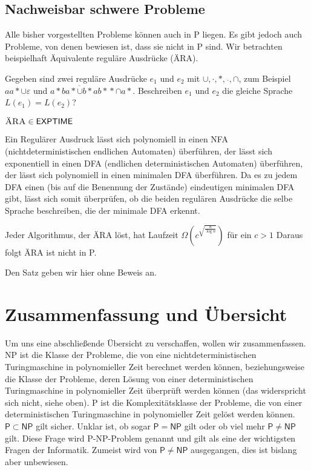 \subsection{Nachweisbar schwere Probleme}
Alle bisher vorgestellten Probleme können auch in \textsf{P} liegen. Es gibt jedoch auch Probleme, von denen bewiesen ist, dass sie nicht in \textsf{P} sind. Wir betrachten beispielhaft Äquivalente reguläre Ausdrücke (\textsc{ÄRA}).

Gegeben sind zwei reguläre Ausdrücke $e_1$ und $e_2$ mit $\cup, \cdot, *, \overline{~}, \cap$, zum Beispiel $aa* \cup \varepsilon$ und $\overline{a* b a* \cup b* a b*}* \cap a*$. Beschreiben $e_1$ und $e_2$ die gleiche Sprache $L(e_1) = L(e_2)$?

\begin{Satz}
  \hspace{\parindent}$\textsc{ÄRA} \in \mathsf{EXPTIME}$
\end{Satz}

\begin{Bew}
  \hspace{\parindent}Ein Regulärer Ausdruck lässt sich polynomiell in einen NFA (nichtdeterministischen endlichen Automaten) überführen, der lässt sich exponentiell in einen DFA (endlichen deterministischen Automaten) überführen, der lässt sich polynomiell in einen minimalen DFA überführen. Da es zu jedem DFA einen (bis auf die Benennung der Zustände) eindeutigen minimalen DFA gibt, lässt sich somit überprüfen, ob die beiden regulären Ausdrücke die selbe Sprache beschreiben, die der minimale DFA erkennt.
\end{Bew}
\begin{Satz}
  \hspace{\parindent}Jeder Algorithmus, der \textsc{ÄRA} löst, hat Laufzeit $\Omega(c^{\sqrt{\frac{n}{\log n}}})$ für ein $c > 1$ Daraus folgt ÄRA ist nicht in \textsf{P}.
\end{Satz}

Den Satz geben wir hier ohne Beweis an.


\section{Zusammenfassung und Übersicht}
Um uns eine abschließende Übersicht zu verschaffen, wollen wir zusammenfassen. \textsf{NP} ist die Klasse der Probleme, die von eine nichtdeterministischen Turingmaschine in polynomieller Zeit berechnet werden können, beziehungsweise die Klasse der Probleme, deren Lösung von einer deterministischen Turingmaschine in polynomieller Zeit überprüft werden können (das widerspricht sich nicht, siehe oben). \textsf{P} ist die Komplexitätsklasse der Probleme, die von einer deterministischen Turingmaschine in polynomieller Zeit gelöst werden können. $\mathsf{P} \subset \mathsf{NP}$ gilt sicher. Unklar ist, ob sogar $\mathsf{P} = \mathsf{NP}$ gilt oder ob viel mehr $\mathsf{P} \neq \mathsf{NP}$ gilt. Diese Frage wird \textsf{P}-\textsf{NP}-Problem genannt und gilt als eine der wichtigsten Fragen der Informatik. Zumeist wird von $\mathsf{P} \neq \mathsf{NP}$ ausgegangen, dies ist bislang aber unbewiesen.

